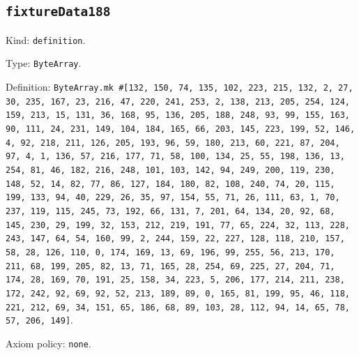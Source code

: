\documentclass[11pt]{article}
\begin{document}
\subsection*{\texttt{fixtureData188}}
\noindent Kind: \texttt{definition}.\par
\noindent Type: \texttt{ByteArray}.\par
\noindent Definition: \texttt{ByteArray.mk \#[132, 150, 74, 135, 102, 223, 215, 132, 2, 27, 30, 235, 167, 23, 216, 47, 220, 241, 253, 2, 138, 213, 205, 254, 124, 159, 213, 15, 131, 36, 168, 95, 136, 205, 188, 248, 93, 99, 155, 163, 90, 111, 24, 231, 149, 104, 184, 165, 66, 203, 145, 223, 199, 52, 146, 4, 92, 218, 211, 126, 205, 193, 96, 59, 180, 213, 60, 221, 87, 204, 97, 4, 1, 136, 57, 216, 177, 71, 58, 100, 134, 25, 55, 198, 136, 13, 254, 81, 46, 182, 216, 248, 101, 103, 142, 94, 249, 200, 119, 230, 148, 52, 14, 82, 77, 86, 127, 184, 180, 82, 108, 240, 74, 20, 115, 199, 133, 94, 40, 229, 26, 35, 97, 154, 55, 71, 26, 111, 63, 1, 70, 237, 119, 115, 245, 73, 192, 66, 131, 7, 201, 64, 134, 20, 92, 68, 145, 230, 29, 199, 32, 153, 212, 219, 191, 77, 65, 224, 32, 113, 228, 243, 147, 64, 54, 160, 99, 2, 244, 159, 22, 227, 128, 118, 210, 157, 58, 28, 126, 110, 0, 174, 169, 13, 69, 196, 99, 255, 56, 213, 170, 211, 68, 199, 205, 82, 13, 71, 165, 28, 254, 69, 225, 27, 204, 71, 174, 28, 169, 70, 191, 25, 158, 34, 223, 5, 206, 177, 214, 211, 238, 172, 242, 92, 69, 92, 52, 213, 189, 89, 0, 165, 81, 199, 95, 46, 118, 221, 212, 69, 34, 151, 65, 186, 68, 89, 103, 28, 112, 94, 14, 65, 78, 57, 206, 149]}.\par
\noindent Axiom policy: \texttt{none}.\par
\end{document}
